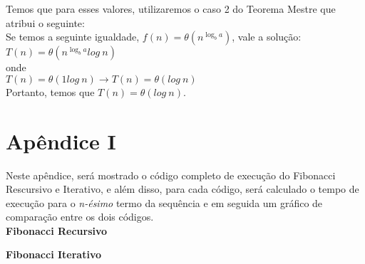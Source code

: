 \documentclass[a4paper, 12pt]{article}
\begin{document}
Temos que para esses valores, utilizaremos o caso 2 do Teorema Mestre que atribui o seguinte:\\

Se temos a seguinte igualdade, $f(n) = \theta(n^{\log_b a})$, vale a solução:\\

$T(n) = \theta(n^{\log_b a}log \ n)$ \\

onde \\

$T(n) = \theta(1log \ n) \rightarrow T(n) = \theta(log \ n)$ \\

Portanto, temos que $T(n) = \theta(log \ n)$.

\newpage
\section{Apêndice I}
Neste apêndice, será mostrado o código completo de execução do Fibonacci Rescursivo e Iterativo, e além disso, para cada código, será calculado o tempo de execução para o {\it n-ésimo} termo da sequência e em seguida um gráfico de comparação entre os dois códigos.\\

{\large\bf Fibonacci Recursivo}

\vspace{0.3cm}
{\large\bf\quad Fibonacci Iterativo}

\end{document}
